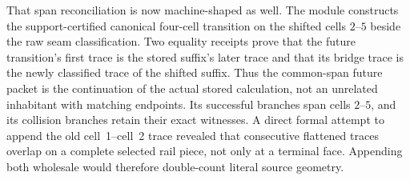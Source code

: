 \documentclass[11pt]{article}
\theoremstyle{definition}
\begin{document}
That span reconciliation is now machine-shaped as well.  The module
constructs the support-certified canonical four-cell transition on the shifted
cells $2$--$5$ beside the raw seam classification.  Two equality receipts
prove that the future transition's first trace is the stored suffix's later
trace and that its bridge trace is the newly classified trace of the shifted
suffix.  Thus the common-span future packet is the continuation of the actual
stored calculation, not an unrelated inhabitant with matching endpoints.  Its
successful branches span cells $2$--$5$, and its collision branches retain
their exact witnesses.  A direct formal attempt to append the old
cell~1--cell~2 trace revealed that consecutive flattened traces overlap on a
complete selected rail piece, not only at a terminal face.  Appending both
wholesale would therefore double-count literal source geometry.
\end{document}
